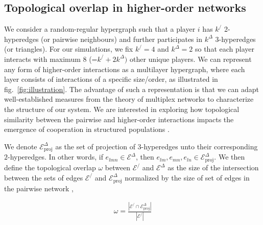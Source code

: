 \documentclass[a4paper,pre,reqno,superscriptaddress,twocolumn, floatfix]{revtex4}
\begin{document}
\subsection{Topological overlap in higher-order networks}

We consider a random-regular hypergraph such that a player $i$ has $k^/$ 2-hyperedges (or pairwise neighbours) and further participates in $k^{\Delta}$ 3-hyperedges (or triangles). For our simulations, we fix $k^/ = 4$ and $k^{\Delta} = 2$ so that each player interacts with maximum 8 (=$k^/+2k^{\Delta})$ other unique players.
%
We can represent any form of higher-order interactions as a multilayer hypergraph, where each layer consists of interactions of a specific size/order, as illustrated in fig.~\eqref{fig:illustration}. The advantage of such a representation is that we can adapt well-established measures from the theory of multiplex networks to characterize the structure of our system. We are interested in exploring how topological similarity between the pairwise and higher-order interactions impacts the emergence of cooperation in structured populations \cite{battiston_structural_2014, lee_how_2021, anwar_intralayer_2022, zhang_higher-order_2023, malizia2025hyperedge, presigny_node-layer_2024}. 

We denote $\mathcal{E}^{\Delta}_{\text{proj}}$ as the set of projection of 3-hyperedges unto their corresponding $2$-hyperedges. In other words, if $e_{lmn} \in \mathcal{E}^{\Delta}$, then $e_{lm}, e_{mn}, e_{ln} \in \mathcal{E}^{\Delta}_{\text{proj}}$. We then define the topological overlap $\omega$ between $\mathcal{E}^/$ and $\mathcal{E}^{\Delta}$ as the size of the intersection between the sets of edges $\mathcal{E}^/$ and $\mathcal{E}^{\Delta}_{\text{proj}}$ normalized by the size of set of edges in the pairwise network \cite{battiston_structural_2014, battiston_determinants_2017, krishnagopal_topology_2023},

\begin{align}
    \omega = \frac{| \mathcal{E}^/ \cap \mathcal{E}^{\Delta}_{\text{proj}} |}{|\mathcal{E}^/|}
\end{align}
\end{document}
